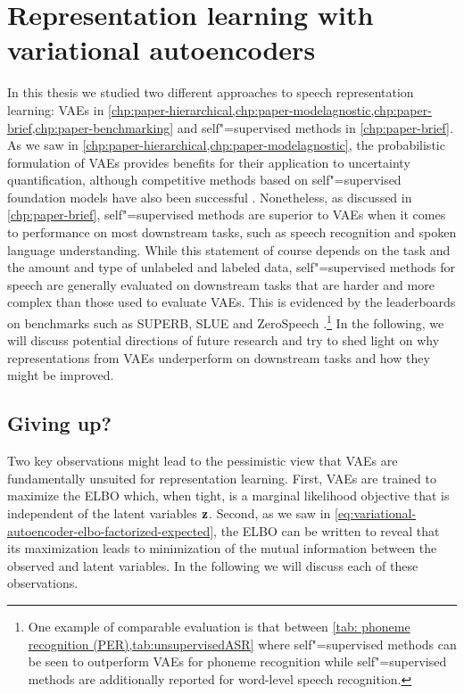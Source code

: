 \section{Representation learning with variational autoencoders}\label{sec_discussion:representation-learning-with-vaes}
%
In this thesis we studied two different approaches to speech representation learning: VAEs in \cref{chp:paper-hierarchical,chp:paper-modelagnostic,chp:paper-brief,chp:paper-benchmarking} and self"=supervised methods in \cref{chp:paper-brief}. 
As we saw in \cref{chp:paper-hierarchical,chp:paper-modelagnostic}, the probabilistic formulation of VAEs provides benefits for their application to uncertainty quantification, although competitive methods based on self"=supervised foundation models have also been successful \parencite{xiao_we_2021,hendrycks_using_2019,bergman_classificationbased_2020}. 
Nonetheless, as discussed in \cref{chp:paper-brief}, self"=supervised methods are superior to VAEs when it comes to performance on most downstream tasks, such as speech recognition and spoken language understanding. 
While this statement of course depends on the task and the amount and type of unlabeled and labeled data, self"=supervised methods for speech are generally evaluated on downstream tasks that are harder and more complex than those used to evaluate VAEs. This is evidenced by the leaderboards on benchmarks such as SUPERB, SLUE and ZeroSpeech \parencite{yang_superb_2021,shon_slue_2021,dunbar_zero_2021}.\footnote{One example of comparable evaluation is that between \cref{tab: phoneme recognition (PER),tab:unsupervisedASR} where self"=supervised methods can be seen to outperform VAEs for phoneme recognition while self"=supervised methods are additionally reported for word-level speech recognition.} 
In the following, we will discuss potential directions of future research and try to shed light on why representations from VAEs underperform on downstream tasks and how they might be improved.


\subsection{Giving up?}

Two key observations might lead to the pessimistic view that VAEs are fundamentally unsuited for representation learning. 
First, VAEs are trained to maximize the ELBO which, when tight, is a marginal likelihood objective that is independent of the latent variables ${\mathbf{z}}$. Second, as we saw in \cref{eq:variational-autoencoder-elbo-factorized-expected}, the ELBO can be written to reveal that its maximization leads to minimization of the mutual information between the observed and latent variables. In the following we will discuss each of these observations.

